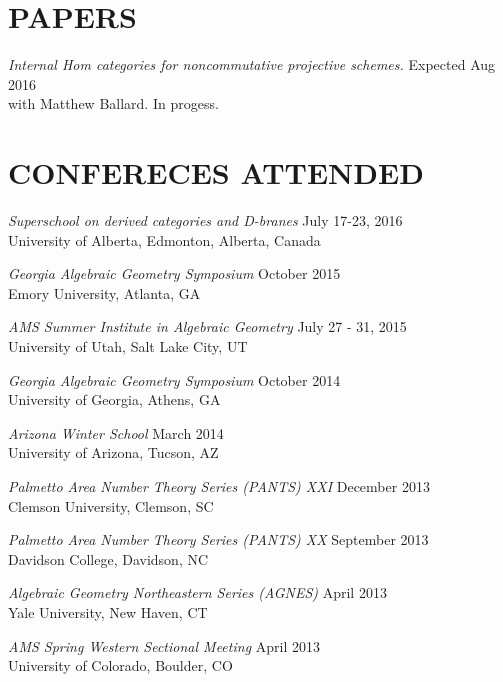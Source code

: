 \documentclass[line,overlapped]{res}
\begin{document}
\begin{resume}
                  \section{PAPERS}
                           {\sl  Internal Hom categories for noncommutative projective schemes.} \hfill Expected Aug 2016\\
		      with Matthew Ballard.  In progess.

                  \section{CONFERECES ATTENDED}
		     {\sl Superschool on derived categories and D-branes} \hfill July 17-23, 2016\\
		     University of Alberta, Edmonton, Alberta, Canada

                          {\sl Georgia Algebraic Geometry Symposium} \hfill October 2015\\
                          Emory University, Atlanta, GA

                          {\sl AMS Summer Institute in Algebraic Geometry} \hfill July 27 - 31, 2015\\
                          University of Utah, Salt Lake City, UT

                          {\sl Georgia Algebraic Geometry Symposium} \hfill October 2014\\
                          University of Georgia, Athens, GA

                          {\sl Arizona Winter School} \hfill March 2014\\
                          University of Arizona, Tucson, AZ

                          {\sl Palmetto Area Number Theory Series (PANTS) XXI} \hfill December 2013\\
                          Clemson University, Clemson, SC

                          {\sl Palmetto Area Number Theory Series (PANTS) XX} \hfill September 2013\\
                          Davidson College, Davidson, NC

                          {\sl Algebraic Geometry Northeastern Series (AGNES)} \hfill April 2013\\
                          Yale University, New Haven, CT

                          {\sl AMS Spring Western Sectional Meeting} \hfill April 2013\\
                          University of Colorado, Boulder, CO


\end{resume}
\end{document}
